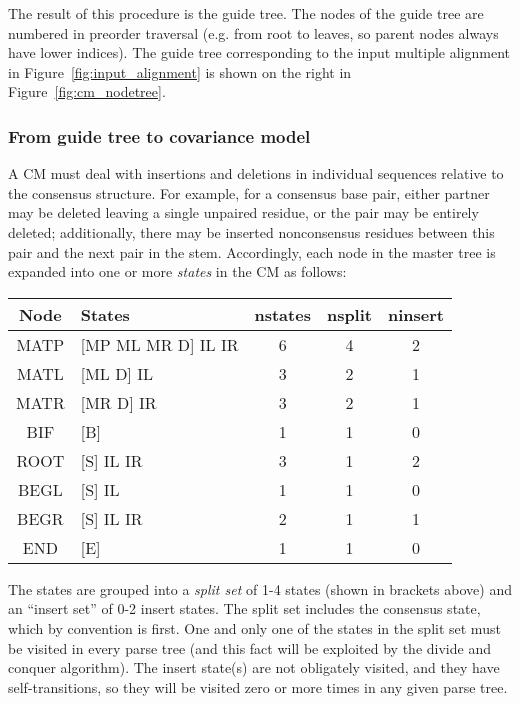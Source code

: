 \documentclass[11pt]{article}
\begin{document}
The result of this procedure is the guide tree. The nodes of the guide
tree are numbered in preorder traversal (e.g. from root to leaves, so
parent nodes always have lower indices). The guide tree corresponding
to the input multiple alignment in Figure~\ref{fig:input_alignment} is
shown on the right in Figure~\ref{fig:cm_nodetree}.

\subsubsection{From guide tree to covariance model}

A CM must deal with insertions and deletions in individual sequences
relative to the consensus structure. For example, for a consensus base
pair, either partner may be deleted leaving a single unpaired residue,
or the pair may be entirely deleted; additionally, there may be
inserted nonconsensus residues between this pair and the next pair in
the stem. Accordingly, each node in the master tree is expanded into
one or more \emph{states} in the CM as follows:

\vspace{0.5em}
\begin{tabular}{clccc}
Node   &  States             & nstates & nsplit & ninsert \\ \hline
MATP   & [MP ML MR D] IL IR  &   6     &   4    &  2   \\
MATL   & [ML D] IL           &   3     &   2    &  1   \\
MATR   & [MR D] IR           &   3     &   2    &  1   \\
BIF    & [B]                 &   1     &   1    &  0   \\
ROOT   & [S] IL IR           &   3     &   1    &  2   \\
BEGL   & [S] IL              &   1     &   1    &  0   \\
BEGR   & [S] IL IR           &   2     &   1    &  1   \\
END    & [E]                 &   1     &   1    &  0   \\ \hline
\end{tabular}
\vspace{0.5em}

The states are grouped into a \emph{split set} of 1-4 states (shown in
brackets above) and an ``insert set'' of 0-2 insert states. The split
set includes the consensus state, which by convention is first. One
and only one of the states in the split set must be visited in every
parse tree (and this fact will be exploited by the divide and conquer
algorithm). The insert state(s) are not obligately visited, and they
have self-transitions, so they will be visited zero or more times in
any given parse tree.
\end{document}
